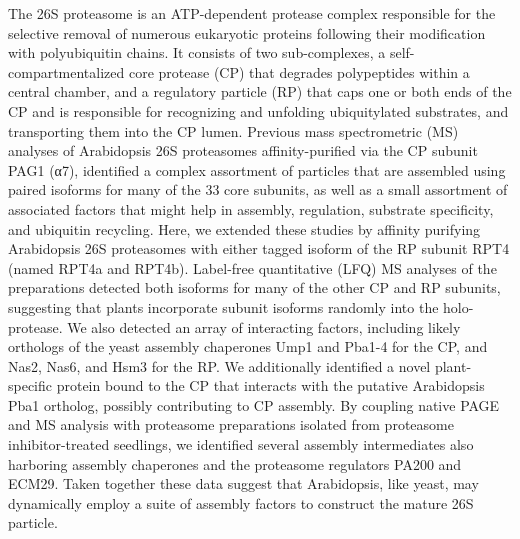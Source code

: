 	The 26S proteasome is an ATP-dependent protease complex responsible for the selective removal of numerous eukaryotic proteins following their modification with polyubiquitin chains.  It consists of two sub-complexes, a self-compartmentalized core protease (CP) that degrades polypeptides within a central chamber, and a regulatory particle (RP) that caps one or both ends of the CP and is responsible for recognizing and unfolding ubiquitylated substrates, and transporting them into the CP lumen.  Previous mass spectrometric (MS) analyses of Arabidopsis 26S proteasomes affinity-purified via the CP subunit PAG1 (α7), identified a complex assortment of particles that are assembled using paired isoforms for many of the 33 core subunits, as well as a small assortment of associated factors that might help in assembly, regulation, substrate specificity, and ubiquitin recycling.  Here, we extended these studies by affinity purifying Arabidopsis 26S proteasomes with either tagged isoform of the RP subunit RPT4 (named RPT4a and RPT4b).  Label-free quantitative (LFQ) MS analyses of the preparations detected both isoforms for many of the other CP and RP subunits, suggesting that plants incorporate subunit isoforms randomly into the holo-protease.  We also detected an array of interacting factors, including likely orthologs of the yeast assembly chaperones Ump1 and Pba1-4 for the CP, and Nas2, Nas6, and Hsm3 for the RP.  We additionally identified a novel plant-specific protein bound to the CP that interacts with the putative Arabidopsis Pba1 ortholog, possibly contributing to CP assembly.  By coupling native PAGE and MS analysis with proteasome preparations isolated from proteasome inhibitor-treated seedlings, we identified several assembly intermediates also harboring assembly chaperones and the proteasome regulators PA200 and ECM29.  Taken together these data suggest that Arabidopsis, like yeast, may dynamically employ a suite of assembly factors to construct the mature 26S particle.
 
